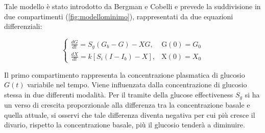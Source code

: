 Tale modello è stato introdotto da Bergman e Cobelli \cite{bergman_quantitative_1979} e prevede la suddivisione in due compartimenti (\cref{fig:modellominimo}), rappresentati da due equazioni differenziali:

\begin{equation}
	\begin{cases}\frac{d G}{d t}=S_{g}\left(G_{b}-G\right)-X G, & \mathrm{G}(0)=G_{0} \\ \frac{d X}{d t}=k\left[S_{i}\left(I-I_{b}\right)-X\right], & \mathrm{X}(0)=X_{0}\end{cases}
	\label{eq:modello}
\end{equation}

Il primo compartimento rappresenta la concentrazione plasmatica di glucosio $G(t)$ variabile nel tempo. Viene influenzata dalla concentrazione di glucosio stessa in due differenti modalità. Per il tramite della glucose effectiveness $S_g$ si ha un verso di crescita proporzionale alla differenza tra la concentrazione basale e quella attuale, si osservi che tale differenza diventa negativa per cui più cresce il divario, rispetto la concentrazione basale, più il glucosio tenderà a diminuire. 

